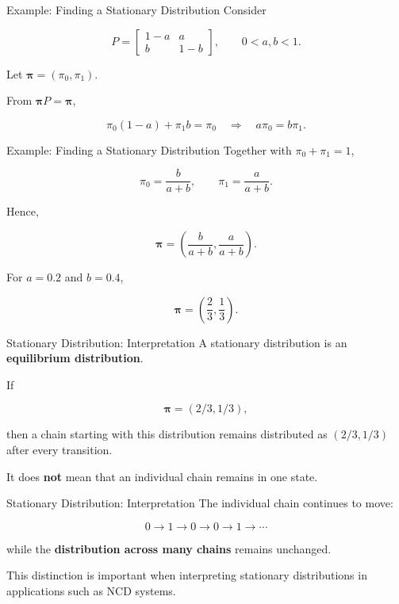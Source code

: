 \documentclass[
  ignorenonframetext,
  aspectratio=169,
]{beamer}
\begin{document}
\begin{frame}{Example: Finding a Stationary Distribution}
\protect{}\label{example-finding-a-stationary-distribution}
Consider

\[
P=
\begin{bmatrix}
1-a&a\\
b&1-b
\end{bmatrix},
\qquad 0<a,b<1.
\]

Let \(\boldsymbol{\pi}=(\pi_0,\pi_1)\).

From \(\boldsymbol{\pi}P=\boldsymbol{\pi}\),

\[
\pi_0(1-a)+\pi_1b=\pi_0
\quad\Longrightarrow\quad
a\pi_0=b\pi_1.
\]
\end{frame}

\begin{frame}{Example: Finding a Stationary Distribution}
\protect{}\label{example-finding-a-stationary-distribution-1}
Together with \(\pi_0+\pi_1=1\),

\[
\boxed{
\pi_0=\frac{b}{a+b},
\qquad
\pi_1=\frac{a}{a+b}.
}
\]

Hence,

\[
\boxed{
\boldsymbol{\pi}
=
\left(
\frac{b}{a+b},
\frac{a}{a+b}
\right).
}
\]

For \(a=0.2\) and \(b=0.4\),

\[
\boxed{\boldsymbol{\pi}=\left(\frac23,\frac13\right).}
\]
\end{frame}

\begin{frame}{Stationary Distribution: Interpretation}
\protect{}\label{stationary-distribution-interpretation}
A stationary distribution is an \textbf{equilibrium distribution}.

If

\[
\boldsymbol{\pi}=(2/3,1/3),
\]

then a chain starting with this distribution remains distributed as
\((2/3,1/3)\) after every transition.

It does \textbf{not} mean that an individual chain remains in one state.
\end{frame}

\begin{frame}{Stationary Distribution: Interpretation}
\protect{}\label{stationary-distribution-interpretation-1}
The individual chain continues to move:

\[
0\longrightarrow1\longrightarrow0\longrightarrow0\longrightarrow1\longrightarrow\cdots
\]

while the \textbf{distribution across many chains} remains unchanged.

This distinction is important when interpreting stationary distributions
in applications such as NCD systems.
\end{frame}
\end{document}
